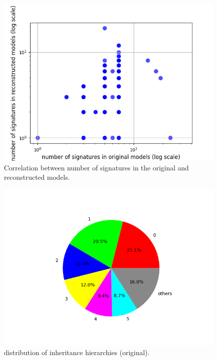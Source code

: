 \begin{figure}[htbp]
\centerline{\includegraphics[width=\linewidth]{"./Correlation between number of signatures in the original and reconstructed models.png"}}
\caption{Correlation between number of signatures in the original and reconstructed models.}
\label{fig}
\end{figure}


\begin{figure}[htbp]
\centerline{\includegraphics[width=\linewidth]{"./distribution of inheritance hierarchies (original).png"}}
\caption{distribution of inheritance hierarchies (original).}
\label{fig}
\end{figure}


